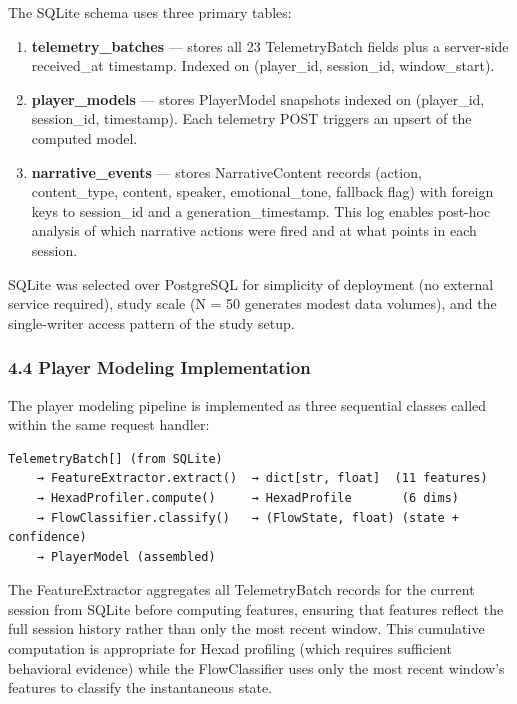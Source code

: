 The SQLite schema uses three primary tables:

\begin{enumerate}
\def\labelenumi{\arabic{enumi}.}
\tightlist
\item
  \textbf{telemetry\_batches} --- stores all 23 TelemetryBatch fields
  plus a server-side received\_at timestamp. Indexed on (player\_id,
  session\_id, window\_start).
\item
  \textbf{player\_models} --- stores PlayerModel snapshots indexed on
  (player\_id, session\_id, timestamp). Each telemetry POST triggers an
  upsert of the computed model.
\item
  \textbf{narrative\_events} --- stores NarrativeContent records
  (action, content\_type, content, speaker, emotional\_tone, fallback
  flag) with foreign keys to session\_id and a generation\_timestamp.
  This log enables post-hoc analysis of which narrative actions were
  fired and at what points in each session.
\end{enumerate}

SQLite was selected over PostgreSQL for simplicity of deployment (no
external service required), study scale (N = 50 generates modest data
volumes), and the single-writer access pattern of the study setup.

\subsubsection{4.4 Player Modeling
Implementation}\label{player-modeling-implementation}

The player modeling pipeline is implemented as three sequential classes
called within the same request handler:

\begin{verbatim}
TelemetryBatch[] (from SQLite)
    → FeatureExtractor.extract()  → dict[str, float]  (11 features)
    → HexadProfiler.compute()     → HexadProfile       (6 dims)
    → FlowClassifier.classify()   → (FlowState, float) (state + confidence)
    → PlayerModel (assembled)
\end{verbatim}

The FeatureExtractor aggregates all TelemetryBatch records for the
current session from SQLite before computing features, ensuring that
features reflect the full session history rather than only the most
recent window. This cumulative computation is appropriate for Hexad
profiling (which requires sufficient behavioral evidence) while the
FlowClassifier uses only the most recent window's features to classify
the instantaneous state.

